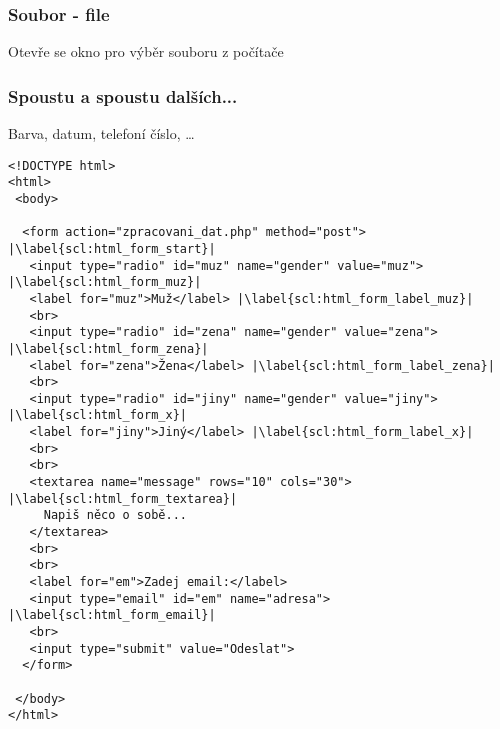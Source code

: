 \subsubsection{Soubor - file}
Otevře se okno pro výběr souboru z počítače
\subsubsection{Spoustu a spoustu dalších...}
Barva, datum, telefoní číslo, \dots 


\begin{minipage}[t]{.45\textwidth}
\begin{code}
\begin{verbatim}
<!DOCTYPE html>
<html>
 <body>
  
  <form action="zpracovani_dat.php" method="post"> |\label{scl:html_form_start}|
   <input type="radio" id="muz" name="gender" value="muz"> |\label{scl:html_form_muz}|
   <label for="muz">Muž</label> |\label{scl:html_form_label_muz}|
   <br>   
   <input type="radio" id="zena" name="gender" value="zena"> |\label{scl:html_form_zena}|
   <label for="zena">Žena</label> |\label{scl:html_form_label_zena}|
   <br>
   <input type="radio" id="jiny" name="gender" value="jiny"> |\label{scl:html_form_x}|
   <label for="jiny">Jiný</label> |\label{scl:html_form_label_x}|
   <br>
   <br>
   <textarea name="message" rows="10" cols="30"> |\label{scl:html_form_textarea}|
     Napiš něco o sobě...
   </textarea> 
   <br>
   <br>
   <label for="em">Zadej email:</label>
   <input type="email" id="em" name="adresa"> |\label{scl:html_form_email}|
   <br>
   <input type="submit" value="Odeslat">
  </form> 

 </body>
</html>
\end{verbatim}

\label{code:html_odkaz}
\end{code}
\end{minipage}
